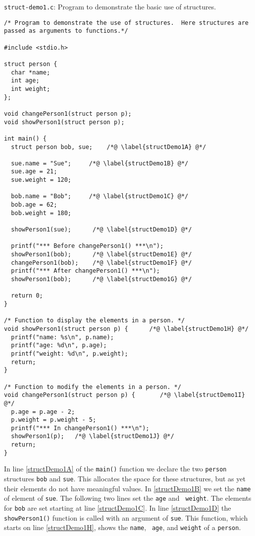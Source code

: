 \begin{program} {\tt struct-demo1.c}: Program to demonstrate the basic
  use of structures.
 \label{pro:structDemo1}
\codemiddle
\begin{lstlisting}
/* Program to demonstrate the use of structures.  Here structures are
passed as arguments to functions.*/

#include <stdio.h>

struct person {
  char *name;
  int age;
  int weight;
};

void changePerson1(struct person p);
void showPerson1(struct person p);

int main() {
  struct person bob, sue;    /*@ \label{structDemo1A} @*/

  sue.name = "Sue";     /*@ \label{structDemo1B} @*/
  sue.age = 21;
  sue.weight = 120;

  bob.name = "Bob";     /*@ \label{structDemo1C} @*/
  bob.age = 62;
  bob.weight = 180;

  showPerson1(sue);      /*@ \label{structDemo1D} @*/
  
  printf("*** Before changePerson1() ***\n");
  showPerson1(bob);      /*@ \label{structDemo1E} @*/
  changePerson1(bob);    /*@ \label{structDemo1F} @*/
  printf("*** After changePerson1() ***\n");
  showPerson1(bob);      /*@ \label{structDemo1G} @*/

  return 0;
}

/* Function to display the elements in a person. */
void showPerson1(struct person p) {      /*@ \label{structDemo1H} @*/
  printf("name: %s\n", p.name);
  printf("age: %d\n", p.age);
  printf("weight: %d\n", p.weight);
  return;
}

/* Function to modify the elements in a person. */
void changePerson1(struct person p) {       /*@ \label{structDemo1I} @*/
  p.age = p.age - 2;
  p.weight = p.weight - 5;
  printf("*** In changePerson1() ***\n");
  showPerson1(p);   /*@ \label{structDemo1J} @*/
  return;
}
\end{lstlisting}
\end{program}
In line \ref{structDemo1A} of the {\tt main()} function we declare the
two {\tt person} structures {\tt bob} and {\tt sue}.  This allocates
the space for these structures, but as yet their elements do not have
meaningful values.  In \ref{structDemo1B} we set the {\tt name} of
element of {\tt sue}.  The following two lines set the {\tt age} and {\tt
  weight}.  The elements for {\tt bob} are set starting at line
\ref{structDemo1C}.  In line \ref{structDemo1D} the {\tt showPerson1()}
function is called with an argument of {\tt sue}.  This function,
which starts on line \ref{structDemo1H}, shows the {\tt name}, {\tt
  age}, and {\tt weight} of a {\tt person}.

